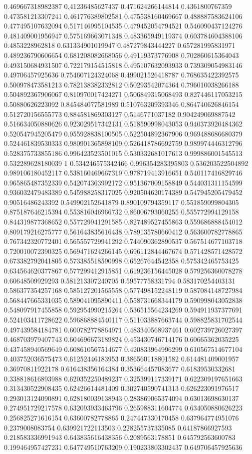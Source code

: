\begin{table}
\begin{tabu}
\begin{sparkline}{10}
0.469667318982387 0.41236485627437 0.471624266144814 0.4361800767359 0.473581213307241 0.461776389802581 0.475538160469667 0.488887583624106 0.477495107632094 0.517146995104535 0.479452054794521 0.546090437124276 0.481409001956947 0.575169663071348 0.483365949119374 0.603784604388106 0.4853228962818 0.631334901019947 0.487279843444227 0.657281995831971 0.489236790606654 0.681208082668056 0.49119373776908 0.702860615364043 0.493150684931507 0.722179154515818 0.495107632093933 0.739309054983146 0.49706457925636 0.754607124324068 0.499021526418787 0.768635422392575 0.500978473581213 0.782138382332812 0.50293542074364 0.796010038266188 0.504892367906067 0.810970017424271 0.506849315068493 0.827446117053215 0.50880626223092 0.845484077581989 0.510763209393346 0.864740626846154 0.512720156555773 0.884581869303127 0.5146771037182 0.904249069887542 0.516634050880626 0.923029517342131 0.518590998043053 0.940373920484362 0.520547945205479 0.955928838100505 0.522504892367906 0.969488686680379 0.524461839530333 0.980901365898109 0.526418786692759 0.989974446312796 0.528375733855186 0.996423523501015 0.530332681017613 0.999886001545513 0.532289628180039 1 0.534246575342466 0.996354283395803 0.536203522504892 0.989106180452117 0.538160469667319 0.978719413916651 0.540117416829746 0.965865487352339 0.542074363992172 0.951367009158849 0.544031311154599 0.936032479483389 0.545988258317025 0.920504620174389 0.547945205479452 0.90516486243392 0.549902152641879 0.890109794359117 0.551859099804305 0.875187646215394 0.553816046966732 0.86006793060255 0.555772994129158 0.844319877368652 0.557729941291585 0.827489527455863 0.559686888454012 0.809179216275777 0.561643835616438 0.789135780660412 0.563600782778865 0.767342320772401 0.565557729941292 0.744090362890537 0.567514677103718 0.720010072390325 0.569471624266145 0.696112844467674 0.571428571428572 0.673382792041805 0.573385518590998 0.65267644542358 0.575342465753425 0.634564620377867 0.577299412915851 0.619236156445028 0.579256360078278 0.60648509929293 0.581213307240705 0.59577758331794 0.583170254403131 0.586377354257168 0.585127201565558 0.577498152248119 0.587084148727984 0.568447665331035 0.589041095890411 0.558731668344179 0.590998043052838 0.548097917455858 0.592954990215264 0.536515564234269 0.594911937377691 0.524103411728622 0.596868884540117 0.511033887663744 0.598825831702544 0.497439584184781 0.600782778864971 0.483340568937461 0.602739726027397 0.468703979407743 0.604696673189824 0.453430746714176 0.60665362035225 0.437458940569649 0.608610567514677 0.420833964996299 0.610567514677104 0.403752036575473 0.61252446183953 0.386560118801582 0.614481409001957 0.36970811922178 0.616438356164384 0.353664457083677 0.61839530332681 0.338818616893988 0.620352250489237 0.325399117339171 0.622309197651663 0.313430522908435 0.62426614481409 0.302740590741313 0.626223091976517 0.293013124090891 0.628180039138943 0.283869065374094 0.63013698630137 0.274951729217578 0.632093933463796 0.265988311604774 0.634050880626223 0.256825271616154 0.63600782778865 0.247447330170458 0.637964774951076 0.2379008083754 0.639921722113503 0.228255737335085 0.64187866927593 0.218583336991943 0.643835616438356 0.2089563178851 0.645792563600783 0.199464957427231 0.647749510763209 0.190233803302437 0.649706457925636 
\end{sparkline}
\end{tabu}
\end{table}

